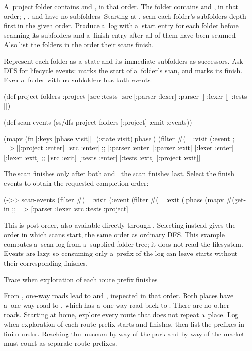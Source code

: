 {{{ A~project folder contains  and
, in that order. The  folder contains
 and , in that order; ,
, and  have no subfolders. Starting at
, scan each folder's subfolders depth-first in the given
order. Produce a~log with a~start entry for each folder before scanning its
subfolders and a~finish entry after all of them have been scanned. Also
list the folders in the order their scans finish.

\smallskip
{} Represent each folder as a~state and its immediate
subfolders as successors. Ask DFS for lifecycle events: 
marks the start of a~folder's scan, and  marks its finish.
Even a~folder with no subfolders has both events:

\begtt {}
(def project-folders
  {:project [:src :tests]
   :src [:parser :lexer]
   :parser []
   :lexer []
   :tests []})

(def scan-events
  (ss/dfs project-folders [:project] {:emit :events}))

(mapv (fn [{:keys [phase visit]}] [(:state visit) phase])
      (filter #(= :visit (:event %
;; => [[:project :enter] [:src :enter]
;;     [:parser :enter] [:parser :exit] [:lexer :enter] [:lexer :exit]
;;     [:src :exit] [:tests :enter] [:tests :exit] [:project :exit]]
\endtt

The  scan finishes only after both  and
; the  scan finishes last. Select the finish
events to obtain the requested completion order:

\begtt {}
(->> scan-events
     (filter #(= :visit (:event %
     (filter #(= :exit (:phase %
     (mapv #(get-in %
;; => [:parser :lexer :src :tests :project]
\endtt

This is post-order, also available directly through
. Selecting 
instead gives the order in which scans start, the same order as ordinary
DFS. This example computes a~scan log from a~supplied folder tree; it does
not read the filesystem. Events are lazy, so consuming only a~prefix of the
log can leave starts without their corresponding finishes.

\secc Trace when exploration of each route prefix finishes

 From , one-way roads lead to
 and , inspected in that order. Both places have
a~one-way road to , which has a~one-way road back to
. There are no other roads. Starting at home, explore every route
that does not repeat a~place. Log when exploration of each route prefix
starts and finishes, then list the prefixes in finish order. Reaching the
museum by way of the park and by way of the market must count as separate
route prefixes.

}}}
